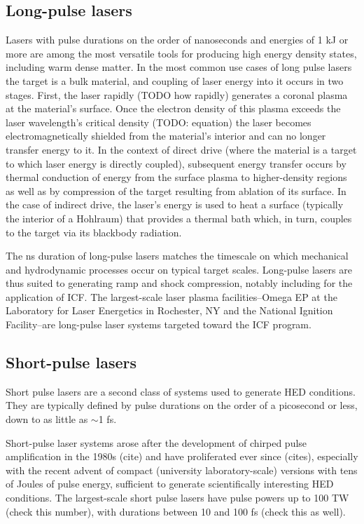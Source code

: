 \documentclass [11pt, proquest, article] {uwthesis}[2016/11/22]
\begin{document}
\subsection{Long-pulse lasers}
Lasers with pulse durations on the order of nanoseconds and energies of 1 kJ or more are among the most versatile tools for producing high energy density states, including warm dense matter. In the most common use cases of long pulse lasers the target is a bulk material, and coupling of laser energy into it occurs in two stages. First, the laser rapidly (TODO how rapidly) generates a coronal plasma at the material's surface. Once the electron density of this plasma exceeds the laser wavelength's critical density (TODO: equation) the laser becomes electromagnetically shielded from the material's interior and can no longer transfer energy to it. In the context of direct drive (where the material is a target to which laser energy is directly coupled), subsequent energy transfer occurs by thermal conduction of energy from the surface plasma to higher-density regions as well as by compression of the target resulting from ablation of its surface. In the case of indirect drive, the laser's energy is used to heat a surface (typically the interior of a Hohlraum) that provides a thermal bath which, in turn, couples to the target via its blackbody radiation. 

The ns duration of long-pulse lasers matches the timescale on which mechanical and hydrodynamic processes occur on typical target scales. Long-pulse lasers are thus suited to generating ramp and shock compression, notably including for the application of ICF. The largest-scale laser plasma facilities--Omega EP at the Laboratory for Laser Energetics in Rochester, NY and the National Ignition Facility--are long-pulse laser systems targeted toward the ICF program.


\subsection{Short-pulse lasers}
Short pulse lasers are a second class of systems used to generate HED conditions. They are typically defined by pulse durations on the order of a picosecond or less, down to as little as $\sim$1 fs. 

Short-pulse laser systems arose after the development of chirped pulse amplification in the 1980s (cite) and have proliferated ever since (cites), especially with the recent advent of compact (university laboratory-scale) versions with tens of Joules of pulse energy, sufficient to generate scientifically interesting HED conditions. The largest-scale short pulse lasers have pulse powers up to 100 TW (check this number), with durations between 10 and 100 fs (check this as well).
\end{document}
